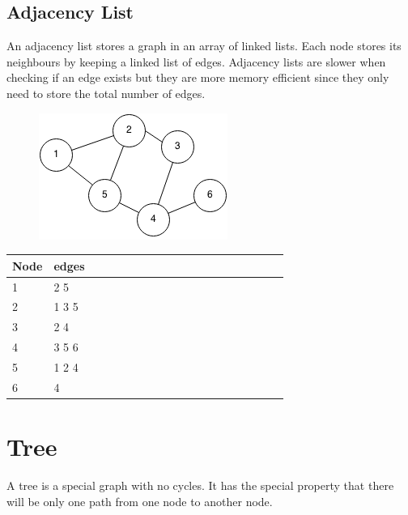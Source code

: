 \documentclass[11pt,oneside]{book}
\makeatletter
\def\maxwidth#1{\ifdim\Gin@nat@width>#1 #1\else\Gin@nat@width\fi}
\makeatother
\begin{document}
        \section{ Adjacency List }
        

An adjacency list stores a graph in an array of linked lists. Each node stores its neighbours by keeping a linked list of edges. Adjacency lists are slower when checking if an edge exists but they are more memory efficient since they only need to store the total number of edges.

\vspace{5px}\begin{figure}[H]\centering
        \includegraphics[width=0.66\maxwidth{\textwidth}]{graph.png}
        \end{figure}

\vspace{10px}\begin{tabulary}{0.4\linewidth}{|l|l|l|l|l|l|l|l|l|l|l|l|l|l|l|l|l|l|l}\hline


  Node &
  edges\\
\hline


  1 &
  2 5\\

  2 &
  1 3 5\\

  3 &
  2 4\\

  4 &
  3 5 6\\

  5 &
  1 2 4\\

  6 &
  4\\

\hline\end{tabulary}

    \chapter{ Tree }
        



A tree is a special graph with no cycles. It has the special property that there will be only one path from one node to another node.
\end{document}
